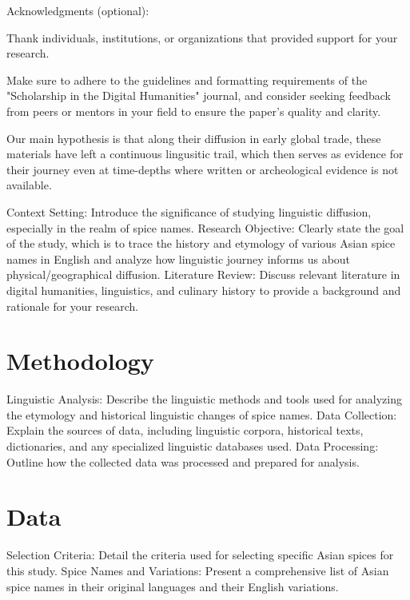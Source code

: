 \documentclass{dsh} %
\begin{document}
    Acknowledgments (optional):

    Thank individuals, institutions, or organizations that provided support for your research.

Make sure to adhere to the guidelines and formatting requirements of the "Scholarship in the Digital Humanities" journal, and consider seeking feedback from peers or mentors in your field to ensure the paper's quality and clarity.










Our main hypothesis is that along their diffusion in early global trade, these materials have left a continuous lingusitic trail, which then serves as evidence for their journey even at time-depths where written or archeological evidence is not available.



Context Setting: Introduce the significance of studying linguistic diffusion, especially in the realm of spice names.
Research Objective: Clearly state the goal of the study, which is to trace the history and etymology of various Asian spice names in English and analyze how linguistic journey informs us about physical/geographical diffusion.
Literature Review: Discuss relevant literature in digital humanities, linguistics, and culinary history to provide a background and rationale for your research.

\section{Methodology}

Linguistic Analysis: Describe the linguistic methods and tools used for analyzing the etymology and historical linguistic changes of spice names.
Data Collection: Explain the sources of data, including linguistic corpora, historical texts, dictionaries, and any specialized linguistic databases used.
Data Processing: Outline how the collected data was processed and prepared for analysis.

\section{Data}

Selection Criteria: Detail the criteria used for selecting specific Asian spices for this study.
Spice Names and Variations: Present a comprehensive list of Asian spice names in their original languages and their English variations.
\end{document}
